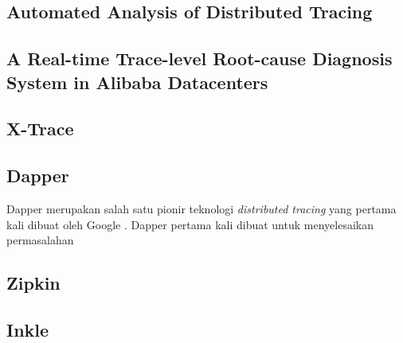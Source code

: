 \subsection{Automated Analysis of Distributed Tracing}

\subsection{A Real-time Trace-level Root-cause Diagnosis System in Alibaba Datacenters}

\subsection{X-Trace}

\subsection{Dapper}

Dapper merupakan salah satu pionir teknologi \textit{distributed tracing} yang pertama kali dibuat oleh Google \citep{dapper-paper}. Dapper pertama kali dibuat untuk menyelesaikan permasalahan 

\subsection{Zipkin}

\subsection{Inkle}

